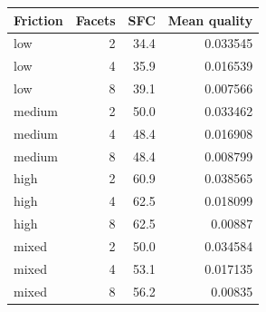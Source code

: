 \begin{tabular}{lrrr}
\toprule
Friction & Facets & SFC & Mean quality \\
\midrule
low & 2 & 34.4 & 0.033545 \\
low & 4 & 35.9 & 0.016539 \\
low & 8 & 39.1 & 0.007566 \\
medium & 2 & 50.0 & 0.033462 \\
medium & 4 & 48.4 & 0.016908 \\
medium & 8 & 48.4 & 0.008799 \\
high & 2 & 60.9 & 0.038565 \\
high & 4 & 62.5 & 0.018099 \\
high & 8 & 62.5 & 0.00887 \\
mixed & 2 & 50.0 & 0.034584 \\
mixed & 4 & 53.1 & 0.017135 \\
mixed & 8 & 56.2 & 0.00835 \\
\bottomrule
\end{tabular}
